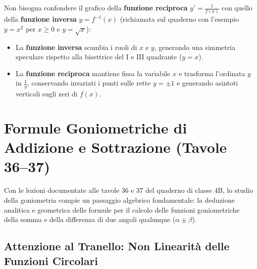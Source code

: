\documentclass[11pt,a4paper,oneside]{report}
\begin{document}
\begin{attenzione}
Non bisogna confondere il grafico della \textbf{funzione reciproca} $y' = \frac{1}{f(x)}$ con quello della \textbf{funzione inversa} $y = f^{-1}(x)$ (richiamata sul quaderno con l'esempio $y = x^2$ per $x \ge 0$ e $y = \sqrt{x}$):
\begin{itemize}
    \item La \textbf{funzione inversa} scambia i ruoli di $x$ e $y$, generando una simmetria speculare rispetto alla bisettrice del I e III quadrante ($y = x$).
    \item La \textbf{funzione reciproca} mantiene fissa la variabile $x$ e trasforma l'ordinata $y$ in $\frac{1}{y}$, conservando invariati i punti sulle rette $y = \pm 1$ e generando asintoti verticali sugli zeri di $f(x)$.
\end{itemize}
\end{attenzione}

\chapter{Formule Goniometriche di Addizione e Sottrazione (Tavole 36--37)}

Con le lezioni documentate alle tavole 36 e 37 del quaderno di classe 4B, lo studio della goniometria compie un passaggio algebrico fondamentale: la deduzione analitica e geometrica delle formule per il calcolo delle funzioni goniometriche della somma e della differenza di due angoli qualunque ($\alpha \pm \beta$).

\section{Attenzione al Tranello: Non Linearit\`a delle Funzioni Circolari}
\end{document}
